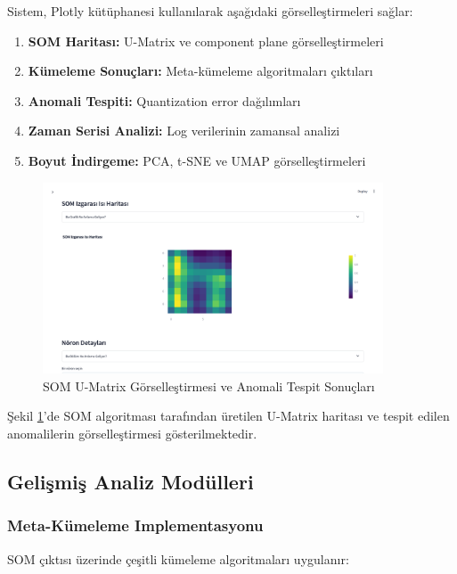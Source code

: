 Sistem, Plotly kütüphanesi kullanılarak aşağıdaki görselleştirmeleri sağlar:

\begin{enumerate}
    \item \textbf{SOM Haritası:} U-Matrix ve component plane görselleştirmeleri
    \item \textbf{Kümeleme Sonuçları:} Meta-kümeleme algoritmaları çıktıları
    \item \textbf{Anomali Tespiti:} Quantization error dağılımları
    \item \textbf{Zaman Serisi Analizi:} Log verilerinin zamansal analizi
    \item \textbf{Boyut İndirgeme:} PCA, t-SNE ve UMAP görselleştirmeleri
\end{enumerate}

\begin{figure}[!ht]
    \centering
    \includegraphics[width=0.9\textwidth]{images/som-visualization.png}
    \caption{SOM U-Matrix Görselleştirmesi ve Anomali Tespit Sonuçları}
    \label{fig:som_visualization}
\end{figure}

Şekil \ref{fig:som_visualization}'de SOM algoritması tarafından üretilen U-Matrix haritası ve tespit edilen anomalilerin görselleştirmesi gösterilmektedir.

\subsection{Gelişmiş Analiz Modülleri}

\subsubsection{Meta-Kümeleme Implementasyonu}

SOM çıktısı üzerinde çeşitli kümeleme algoritmaları uygulanır:


